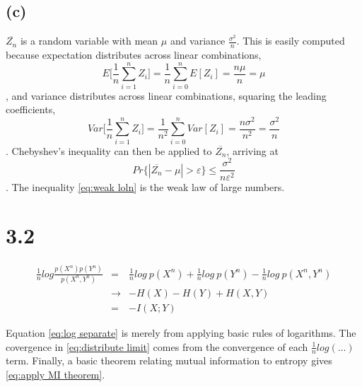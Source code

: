 \documentclass[12pt]{article}
\begin{document}
% 
% 

\subsection*{(c)}

$\overline{Z_n}$ is a random variable with mean $\mu$ and variance
$\frac{\sigma^2}{n}$. This is easily computed because expectation
distributes across linear combinations, 
\begin{equation*}
    E\bigg[\frac{1}{n}\sum_{i=1}^{n}Z_i\bigg] 
    = \frac{1}{n} \sum_{i=0}^{n} E[Z_i] = \frac{n\mu}{n} = \mu
\end{equation*}
, and variance distributes across linear combinations, squaring the
leading coefficients,
\begin{equation*}
    Var\bigg[\frac{1}{n}\sum_{i=1}^{n}Z_i\bigg]
    = \frac{1}{n^2}\sum_{i=0}^{n} Var[Z_i] 
    = \frac{n\sigma^2}{n^2} 
    = \frac{\sigma^2}{n}
\end{equation*}
. Chebyshev's inequality can then be applied to $\overline{Z_n}$, arriving
at
\begin{equation}
    Pr\{ |\overline{Z_n} - \mu| > \varepsilon\} 
        \leq \frac{\sigma^2}{n\varepsilon^2}
    \label{eq:weak loln}
\end{equation}
. The inequality \ref{eq:weak loln} is the weak law of large numbers.

\section*{3.2}

\begin{eqnarray*}
    \frac{1}{n} log \frac{p(X^n)p(Y^n)}{p(X^n,Y^n)} 
        &=& \frac{1}{n} log\ p(X^n) + \frac{1}{n} log\ p(Y^n) 
            - \frac{1}{n} log\ p(X^n,Y^n)  \\
            \label{eq:log separate}
        &\rightarrow& -H(X) -H(Y) + H(X,Y) \\
        \label{eq:distribute limit}
        &=& -I(X;Y)
        \label{eq:apply MI theorem}
\end{eqnarray*}

Equation \ref{eq:log separate} is merely from applying basic rules of
logarithms. The covergence in \ref{eq:distribute limit} comes from the
convergence of each $\frac{1}{n}log(\dots)$ term. 
Finally, a basic theorem relating mutual information to entropy gives 
\ref{eq:apply MI theorem}.
\end{document}
